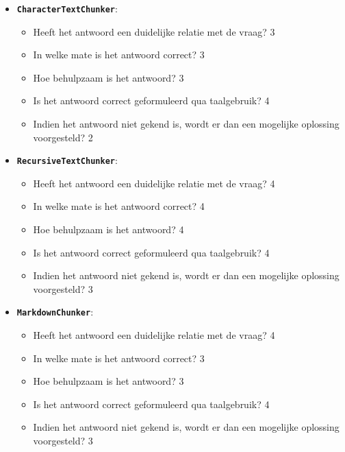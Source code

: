 \subsubsection{}%
\begin{itemize}
    \item \texttt{\textbf{CharacterTextChunker}}:
    \begin{itemize}
        \item Heeft het antwoord een duidelijke relatie met de vraag? 3
        \item In welke mate is het antwoord correct? 3
        \item Hoe behulpzaam is het antwoord? 3
        \item Is het antwoord correct geformuleerd qua taalgebruik? 4
        \item Indien het antwoord niet gekend is, wordt er dan een mogelijke oplossing voorgesteld? 2
    \end{itemize}
    \item \texttt{\textbf{RecursiveTextChunker}}:
    \begin{itemize}
        \item Heeft het antwoord een duidelijke relatie met de vraag? 4
        \item In welke mate is het antwoord correct? 4
        \item Hoe behulpzaam is het antwoord? 4
        \item Is het antwoord correct geformuleerd qua taalgebruik? 4
        \item Indien het antwoord niet gekend is, wordt er dan een mogelijke oplossing voorgesteld? 3
    \end{itemize}
    \item \texttt{\textbf{MarkdownChunker}}:
    \begin{itemize}
        \item Heeft het antwoord een duidelijke relatie met de vraag? 4
        \item In welke mate is het antwoord correct? 3
        \item Hoe behulpzaam is het antwoord? 3
        \item Is het antwoord correct geformuleerd qua taalgebruik? 4
        \item Indien het antwoord niet gekend is, wordt er dan een mogelijke oplossing voorgesteld? 3
    \end{itemize}
\end{itemize}
